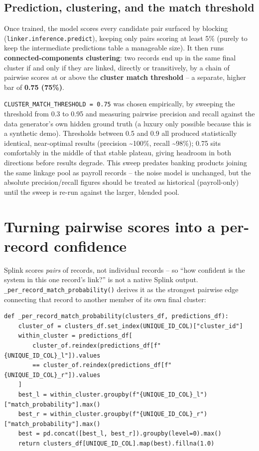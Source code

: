 \documentclass[11pt]{report}
\newcommand{\code}[1]{\lstinline[style=plain]!#1!}
\newcommand{\codeb}[1]{\texttt{\scriptsize #1}}
\begin{document}
\subsection{Prediction, clustering, and the match threshold}

Once trained, the model scores every candidate pair surfaced by blocking (\code{linker.inference.predict}), keeping only pairs scoring at least 5\% (purely to keep the intermediate predictions table a manageable size). It then runs \textbf{connected-components clustering}: two records end up in the same final cluster if and only if they are linked, directly or transitively, by a chain of pairwise scores at or above the \textbf{cluster match threshold} -- a separate, higher bar of \textbf{0.75 (75\%)}.

\begin{engbox}
\codeb{CLUSTER\_MATCH\_THRESHOLD = 0.75} was chosen empirically, by sweeping the threshold from 0.3 to 0.95 and measuring pairwise precision and recall against the data generator's own hidden ground truth (a luxury only possible because this is a synthetic demo). Thresholds between 0.5 and 0.9 all produced statistically identical, near-optimal results (precision \textasciitilde100\%, recall \textasciitilde98\%); 0.75 sits comfortably in the middle of that stable plateau, giving headroom in both directions before results degrade. This sweep predates banking products joining the same linkage pool as payroll records -- the noise model is unchanged, but the absolute precision/recall figures should be treated as historical (payroll-only) until the sweep is re-run against the larger, blended pool.
\end{engbox}

\section{Turning pairwise scores into a per-record confidence}

Splink scores \emph{pairs} of records, not individual records -- so ``how confident is the system in this one record's link?'' is not a native Splink output. \codeb{\_per\_record\_match\_\allowbreak{}probability()} derives it as the strongest pairwise edge connecting that record to another member of its own final cluster:

\begin{lstlisting}[style=py, caption={Deriving a per-record confidence score (\texttt{splink\_service.py})}]
def _per_record_match_probability(clusters_df, predictions_df):
    cluster_of = clusters_df.set_index(UNIQUE_ID_COL)["cluster_id"]
    within_cluster = predictions_df[
        cluster_of.reindex(predictions_df[f"{UNIQUE_ID_COL}_l"]).values
        == cluster_of.reindex(predictions_df[f"{UNIQUE_ID_COL}_r"]).values
    ]
    best_l = within_cluster.groupby(f"{UNIQUE_ID_COL}_l")["match_probability"].max()
    best_r = within_cluster.groupby(f"{UNIQUE_ID_COL}_r")["match_probability"].max()
    best = pd.concat([best_l, best_r]).groupby(level=0).max()
    return clusters_df[UNIQUE_ID_COL].map(best).fillna(1.0)
\end{lstlisting}
\end{document}
